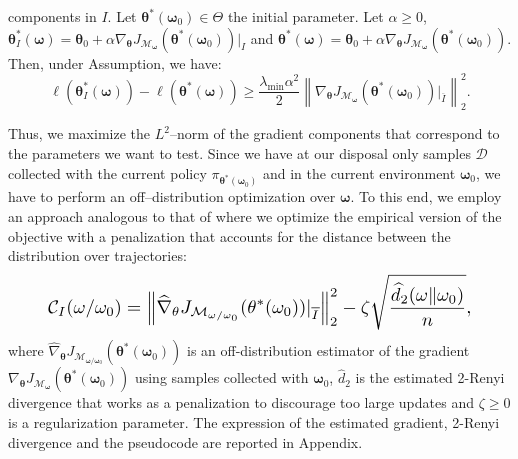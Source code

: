 \documentclass[letterpaper]{article} %
\begin{document}
components in $I$. Let $\mathbf{\theta}^*(\mathbf{\omega}_0) \in \Theta$ the initial parameter. Let $\alpha \ge 0$, $\mathbf{\theta}_I^* (\mathbf{\omega}) =  \mathbf{\theta}_0 + \alpha \nabla_{\mathbf{\theta}} J_{\mathcal{M}_{\mathbf{\omega}}} (\mathbf{\theta}^*(\mathbf{\omega}_0)) \rvert_I$ and $\mathbf{\theta}^* (\mathbf{\omega}) =  \mathbf{\theta}_0 + \alpha \nabla_{\mathbf{\theta}} J_{\mathcal{M}_{\mathbf{\omega}}} (\mathbf{\theta}^*(\mathbf{\omega}_0))$. Then, under Assumption, we have:
	\begin{equation*}
		{\ell}({\mathbf{\theta}_I^*}(\mathbf{\omega})) - {\ell}({\mathbf{\theta}^*}(\mathbf{\omega})) \ge \frac{\lambda_{\min} \alpha^2}{2} \left\| \nabla_{\mathbf{\theta}} J_{\mathcal{M}_{\mathbf{\omega}}} (\mathbf{\theta}^*(\mathbf{\omega}_0)) \rvert_{\overline{I}} \right\|_2^2.
	\end{equation*}


Thus, we maximize the $L^2$--norm of the gradient components that correspond to the parameters we want to test. Since we have at our disposal only samples $\mathcal{D}$ collected with the current policy $\pi_{\mathbf{\theta}^*(\mathbf{\omega}_0)}$ and in the current environment $\mathbf{\omega}_0$, we have to perform an off--distribution optimization over $\mathbf{\omega}$. To this end, we employ an approach analogous to that of where we optimize the empirical version of the objective with a penalization that accounts for the distance between the distribution over trajectories:
\begin{equation}
\resizebox{0.88\linewidth}{!}{$
\displaystyle \mathcal{C}_I(\mathbf{\omega}/\mathbf{\omega}_0) = \left\| \widehat{\nabla}_{\mathbf{\theta}} J_{\mathcal{M}_{\mathbf{\omega}/\mathbf{\omega}_0}}(\mathbf{\theta}^*(\mathbf{\omega}_0)) \rvert_{\overline{I}} \right\|_2^2 - \zeta \sqrt{\frac{	\widehat{d}_2 (\mathbf{\omega} \| \mathbf{\omega}_0) }{n}},$}
\end{equation}
where $\widehat{\nabla}_{\mathbf{\theta}} J_{\mathcal{M}_{\mathbf{\omega}/\mathbf{\omega}_0}}(\mathbf{\theta}^*(\mathbf{\omega}_0))$ is an off-distribution estimator of the gradient $\nabla_{\mathbf{\theta}} J_{\mathcal{M}_{\mathbf{\omega}}} (\mathbf{\theta}^*(\mathbf{\omega}_0))$ using samples collected with $\mathbf{\omega}_0$, $\widehat{d}_2$ is the estimated 2-Renyi divergence that works as a penalization to discourage too large updates and $\zeta \ge 0$ is a regularization parameter. The expression of the estimated gradient, 2-Renyi divergence and the pseudocode are reported in Appendix.
\end{document}
